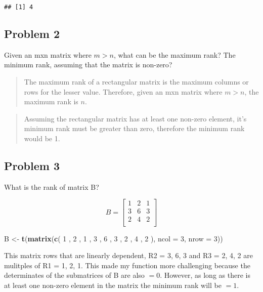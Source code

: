 \documentclass[]{article}
\newenvironment{Shaded}{\begin{snugshade}}{\end{snugshade}}
\newcommand{\KeywordTok}[1]{\textcolor[rgb]{0.13,0.29,0.53}{\textbf{{#1}}}}
\newcommand{\DataTypeTok}[1]{\textcolor[rgb]{0.13,0.29,0.53}{{#1}}}
\newcommand{\DecValTok}[1]{\textcolor[rgb]{0.00,0.00,0.81}{{#1}}}
\newcommand{\StringTok}[1]{\textcolor[rgb]{0.31,0.60,0.02}{{#1}}}
\newcommand{\NormalTok}[1]{{#1}}
\begin{document}
\begin{verbatim}
## [1] 4
\end{verbatim}

\subsection{Problem 2}\label{problem-2}

Given an mxn matrix where \(m > n\), what can be the maximum rank? The
minimum rank, assuming that the matrix is non-zero?

\begin{quote}
The maximum rank of a rectangular matrix is the maximum columns or rows
for the lesser value. Therefore, given an mxn matrix where \(m > n\),
the maximum rank is \(n\).
\end{quote}

\begin{quote}
Assuming the rectangular matrix has at least one non-zero element, it's
minimum rank must be greater than zero, therefore the minimum rank would
be 1.
\end{quote}

\subsection{Problem 3}\label{problem-3}

What is the rank of matrix B?

\[
B = 
\begin{bmatrix}
   1 & 2 & 1 \\
   3 & 6 & 3 \\
   2 & 4 & 2 \\
\end{bmatrix}
\]

\begin{Shaded}
\begin{Highlighting}[]
\NormalTok{B <-}\StringTok{ }\KeywordTok{t}\NormalTok{(}\KeywordTok{matrix}\NormalTok{(}\KeywordTok{c}\NormalTok{( }\DecValTok{1} \NormalTok{, }\DecValTok{2} \NormalTok{, }\DecValTok{1} \NormalTok{,  }\DecValTok{3} \NormalTok{,  }\DecValTok{6} \NormalTok{, }\DecValTok{3} \NormalTok{,  }\DecValTok{2} \NormalTok{,  }\DecValTok{4} \NormalTok{, }\DecValTok{2} \NormalTok{), }\DataTypeTok{ncol =} \DecValTok{3}\NormalTok{, }\DataTypeTok{nrow =} \DecValTok{3}\NormalTok{))}
\end{Highlighting}
\end{Shaded}

This matrix rows that are linearly dependent, R2 = 3, 6, 3 and R3 = 2,
4, 2 are mulitples of R1 = 1, 2, 1. This made my function more
challenging because the determinates of the submatrices of B are also
\(= 0\). However, as long as there is at least one non-zero element in
the matrix the minimum rank will be \(= 1\).
\end{document}
